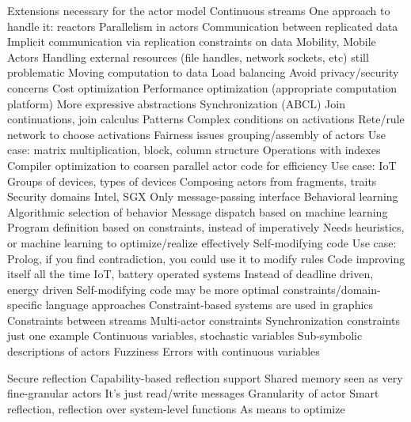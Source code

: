 \documentclass[
graybox,
envcountchap,
]{svmult}
\begin{document}
\begin{bibunit}
Extensions necessary for the actor model
Continuous streams
One approach to handle it: reactors
Parallelism in actors
Communication between replicated data
Implicit communication via replication constraints on data
Mobility, Mobile Actors
Handling external resources (file handles, network sockets, etc) still problematic
Moving computation to data
Load balancing
Avoid privacy/security concerns
Cost optimization
Performance optimization (appropriate computation platform)
More expressive abstractions
Synchronization (ABCL)
Join continuations, join calculus
Patterns
Complex conditions on activations
Rete/rule network to choose activations
Fairness issues
grouping/assembly of actors
Use case: matrix multiplication, block, column structure
Operations with indexes
Compiler optimization to coarsen parallel actor code for efficiency
Use case: IoT
Groups of devices, types of devices
Composing actors from fragments, traits
Security domains Intel, SGX
Only message-passing interface
Behavioral learning
Algorithmic selection of behavior
Message dispatch based on machine learning
Program definition based on constraints, instead of imperatively
Needs heuristics, or machine learning to optimize/realize effectively
Self-modifying code
Use case: Prolog, if you find contradiction, you could use it to modify rules
Code improving itself all the time
IoT, battery operated systems
Instead of deadline driven, energy driven
Self-modifying code may be more optimal
constraints/domain-specific language approaches
Constraint-based systems are used in graphics
Constraints between streams
Multi-actor constraints
Synchronization constraints just one example
Continuous variables, stochastic variables
Sub-symbolic descriptions of actors
Fuzziness
Errors with continuous variables


Secure reflection
Capability-based reflection support
Shared memory seen as very fine-granular actors
It’s just read/write messages
Granularity of actor
Smart reflection, reflection over system-level functions
As means to optimize


	
	
	
	
	

\end{bibunit}
\end{document}
